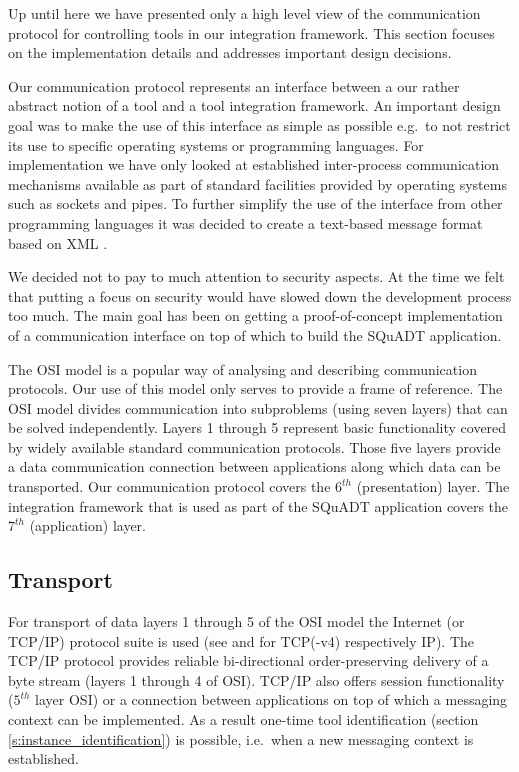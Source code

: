 \documentclass{article}
\newcommand{\squadt}{SQuADT\xspace}
\begin{document}
   Up until here we have presented only a high level view of the communication
   protocol for controlling tools in our integration framework. This section
   focuses on the implementation details and addresses important design
   decisions.
   
   Our communication protocol represents an interface between a our rather
   abstract notion of a tool and a tool integration framework. An important
   design goal was to make the use of this interface as simple as possible
   e.g.\ to not restrict its use to specific operating systems or programming
   languages. For implementation we have only looked at established
   inter-process communication mechanisms available as part of standard
   facilities provided by operating systems such as sockets and pipes.  To
   further simplify the use of the interface from other programming languages
   it was decided to create a text-based message format based on XML
   \cite{XML-1_0-4}.

   We decided not to pay to much attention to security aspects.  At the time we
   felt that putting a focus on security would have slowed down the development
   process too much. The main goal has been on getting a proof-of-concept
   implementation of a communication interface on top of which to build the
   \squadt application.

   The OSI model \cite{Day1983} is a popular way of analysing and describing
   communication protocols. Our use of this model only serves to provide a
   frame of reference. The OSI model divides communication into subproblems
   (using seven layers) that can be solved independently. Layers 1 through 5
   represent basic functionality covered by widely available standard
   communication protocols. Those five layers provide a data communication
   connection between applications along which data can be transported.  Our
   communication protocol covers the $6^{th}$ (presentation) layer. The
   integration framework that is used as part of the \squadt application covers
   the $7^{th}$ (application) layer.
   
  \subsection{Transport} \label{ss:transport}

   For transport of data layers 1 through 5 of the OSI model the Internet (or
   TCP/IP) protocol suite is used (see \cite{rfc793} and \cite{rfc791} for
   TCP(-v4) respectively IP). The TCP/IP protocol provides reliable
   bi-directional order-preserving delivery of a byte stream (layers 1 through
   4 of OSI). TCP/IP also offers session functionality ($5^{th}$ layer OSI) or a
   connection between applications on top of which a messaging context can be
   implemented. As a result one-time tool identification (section
   \ref{s:instance_identification}) is possible, i.e.\ when a new messaging
   context is established. %
\end{document}
